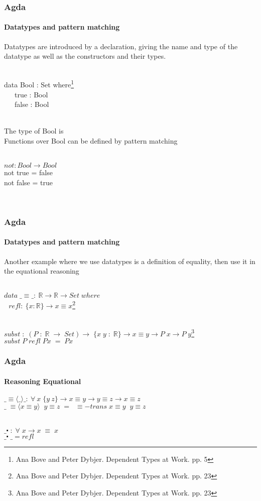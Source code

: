 \documentclass{beamer}
\begin{document}
\begin{frame}
\frametitle{Agda} \framesubtitle{Datatypes and pattern matching}
{ \rm Datatypes are introduced by a  declaration, giving the name and type of the datatype as well as the constructors and their types. \\\

data Bool : Set where\footnote{{{ \tiny \rm
      Ana Bove and Peter Dybjer. Dependent Types at Work. pp. 5}}} \\

~~~true  : Bool \\
~~~false : Bool \\\

The type of Bool is  \\

Functions over Bool can be defined by pattern matching \\\

$not : Bool \to Bool$ \\

not true  = false \\
not false = true} \\
\end{frame}

\begin{frame}
\frametitle{Agda}
\framesubtitle{Datatypes and pattern matching}
{ \rm Another example where we use datatypes is a definition of equality, then use it in the equational reasoning \\\

$data\; \_\equiv\_ :\ \mathbb{R} \to \mathbb{R} \to Set\; where$ \\
$~~~refl :\ \{x : \mathbb{R} \} \to x \equiv x$\footnote{{{ \tiny \rm
      Ana Bove and Peter Dybjer. Dependent Types at Work. pp. 23}}} \\\

$subst\; :\; (P\; :\;\mathbb{R}\; \to\; Set) \to \; \{x\; y\; :\; \mathbb{R}\} \to x \equiv y \to P\; x \to P\; y$\footnote{{{ \tiny \rm
      Ana Bove and Peter Dybjer. Dependent Types at Work. pp. 23}}}\\

$subst\; P\; refl\; Px\; =\; Px$
}
\end{frame}
\begin{frame}
\frametitle{Agda}
\framesubtitle{Reasoning Equational}
$\_ \equiv \langle\_\rangle\_ :\ \forall\ x\; \{y\ z\} \to x \equiv y \to y \equiv z \to x \equiv z$ \\

$\_\; \equiv\langle x\equiv y \rangle\;\; y\equiv z\; =\;\; \equiv-trans\; x\equiv y\;\; y\equiv z$\\\

$\_\centerdot\; :\; \forall\; x \to x\; \equiv\; x$\\
$\_\centerdot\; \_ = refl$
\end{frame}
\end{document}
